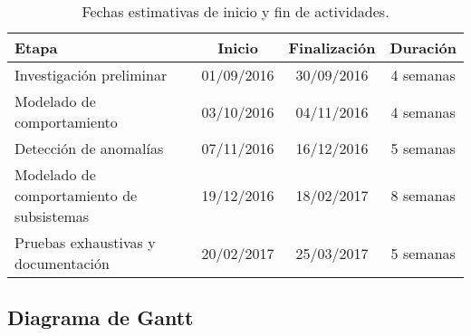 \begin{table}[htbp]
	\begin{center}	
		\begin{tabular}{|l|c|c|c|}
			\hline 
			Etapa & Inicio & Finalización & Duración \\ \hline
			Investigación preliminar & 01/09/2016 & 30/09/2016 & 4 semanas \\
			Modelado de comportamiento & 03/10/2016 & 04/11/2016 & 4 semanas \\
			Detección de anomalías & 07/11/2016 & 16/12/2016 & 5 semanas \\
			Modelado de comportamiento de subsistemas & 19/12/2016 & 18/02/2017 & 8 semanas \\
			Pruebas exhaustivas y documentación & 20/02/2017 & 25/03/2017 & 5 semanas \\ \hline
		\end{tabular}
	\end{center}
	\caption{Fechas estimativas de inicio y fin de actividades.}
	\label{table:cronograma}
\end{table}

\newpage

\subsection*{Diagrama de Gantt}


